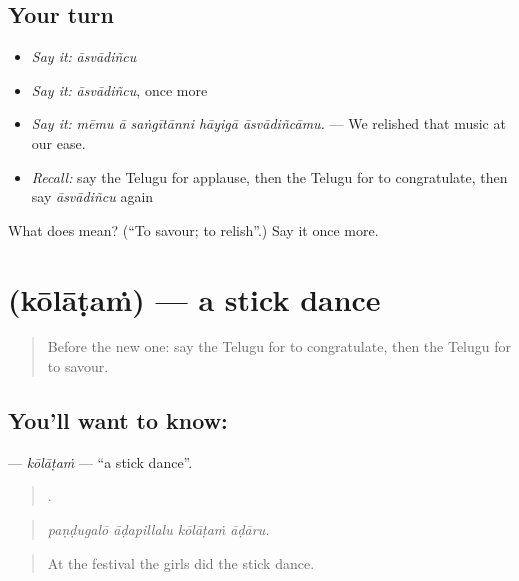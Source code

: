 \subsection*{Your turn}
\begin{itemize}
\raggedright
  \item \emph{Say it:} \emph{āsvādiñcu}
  \item \emph{Say it:} \emph{āsvādiñcu}, once more
  \item \emph{Say it:} \emph{mēmu ā saṅgītānni hāyigā āsvādiñcāmu.} — We relished that music at our ease.
  \item \emph{Recall:} say the Telugu for applause, then the Telugu for to congratulate, then say \emph{āsvādiñcu} again
\end{itemize}

\begin{tcolorbox}[breakable,colback=teal!4,colframe=teal!35!black,title={Before you move on}]
What does  mean? (\textquotedblleft{}To savour; to relish\textquotedblright{}.) Say it once more.
\end{tcolorbox}
\section[\texorpdfstring{\te{కోలాటం} (kōlāṭaṁ)}{కోలాటం (kōlāṭaṁ)}]{ (kōlāṭaṁ) — a stick dance}

\label{lesson:TE-C543-kolatam}



\begin{quote}
Before the new one: say the Telugu for to congratulate, then the Telugu for to savour.
\end{quote}

\subsection*{You'll want to know: }
\textbf{} — \emph{kōlāṭaṁ} — \textquotedblleft{}a stick dance\textquotedblright{}.

\begin{quote}
   .
\end{quote}

\begin{quote}
\emph{paṇḍugalō āḍapillalu kōlāṭaṁ āḍāru.}
\end{quote}

\begin{quote}
At the festival the girls did the stick dance.
\end{quote}

